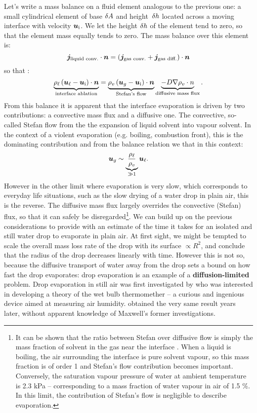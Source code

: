 Let's write a mass balance on a fluid element analogous to the previous one: a small cylindrical element of base $\delta A$ and height~$\delta h$ located across a moving interface with velocity $\bu_\text i$. We let the height $\delta h$ of the element tend to zero, so that the element mass equally tends to zero. The mass balance over this element is:
\begin{equation}
\bj_\text{liquid conv.} \cdot \bn = \lp\bj_\text{gas conv.} + \bj_\text{gas diff.}\rp \cdot \bn
\end{equation}
so that :
\begin{equation}
\underbrace{\rho_\ell \lp\bu_\ell - \bu_\text i\rp \cdot \bn}_\text{interface ablation} = \underbrace{\rho_v \lp\bu_g -\bu_\text i\rp\cdot \bn}_\text{Stefan's flow} \underbrace{- D \nabla \rho_v \cdot n}_\text{diffusive mass flux}.
\label{eq:evaporation_BC}
\end{equation}
From this balance it is apparent that the interface evaporation is driven by two contributions: a convective mass flux and a diffusive one. The convective, so-called Stefan flow from the the expansion of liquid solvent into vapour solvent. 
In the context of a violent evaporation (e.g. boiling, combustion front), this is the dominating contribution and from the balance relation we that in this context:
$$\bu_g \sim \underbrace{\frac{\rho_\ell}{\rho_v}}_{\gg 1} \bu_\ell.$$
However in the other limit where evaporation is very slow, which corresponds to everyday life situations, such as the slow drying of a water drop in plain air, this is the reverse. The diffusive mass flux largely overrides the convective (Stefan) flux, so that it can safely be disregarded\footnote{It can be shown that the ratio between Stefan over diffusive flow is simply the mass fraction of solvent in the gas near the interface \citep{Magdelaine2019}. When a liquid is boiling, the air surrounding the interface is pure solvent vapour, so this mass fraction is of order 1 and Stefan's flow contribution becomes important. Conversely, the saturation vapour pressure of water at ambient temperature is 2.3 kPa -- corresponding to a mass fraction of water vapour in air of 1.5 \%. In this limit, the contribution of Stefan's flow is negligible to describe evaporation.}.
 We can build up on the previous considerations to provide with an estimate of the time it takes for an isolated and still water drop to evaporate in plain air. At first sight, we might be tempted to scale the overall mass loss rate of the drop with its surface $\propto R^2$, and conclude that the radius of the drop decreases linearly with time. However this is not so, because the diffusive transport of water away from the drop sets a bound on how fast the drop evaporates: drop evaporation is an example of a \textbf{diffusion-limited} problem. Drop evaporation in still air was first investigated by \citet{Maxwell1890} who was interested in developing a theory of the wet bulb thermomether -- a curious and ingenious device aimed at measuring air humidity. \citet{Langmuir1918} obtained the very same result years later, without apparent knowledge of Maxwell's former investigations.

